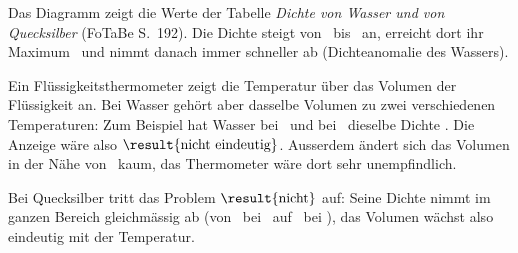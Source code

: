 Das Diagramm zeigt die Werte der Tabelle \emph{Dichte von Wasser und von Quecksilber} (FoTaBe S.~192). Die Dichte steigt von \tdNO\ bis \tdMO\ an, erreicht dort ihr Maximum \rWmO\ und nimmt danach immer schneller ab (Dichteanomalie des Wassers).

\begin{center}
\end{center}

Ein Flüssigkeitsthermometer zeigt die Temperatur über das Volumen der Flüssigkeit an. Bei Wasser gehört aber dasselbe Volumen zu zwei verschiedenen Temperaturen: Zum Beispiel hat Wasser bei \tdAO\ und bei \tdBO\ dieselbe Dichte \rWaO. Die Anzeige wäre also $\result{\text{nicht eindeutig}}$. Ausserdem ändert sich das Volumen in der Nähe von \tdMO\ kaum, das Thermometer wäre dort sehr unempfindlich.

Bei Quecksilber tritt das Problem $\result{\text{nicht}}$ auf: Seine Dichte nimmt im ganzen Bereich gleichmässig ab (von \rHgnO\ bei \tdNO\ auf \rHgzO\ bei \tdZO), das Volumen wächst also eindeutig mit der Temperatur.
